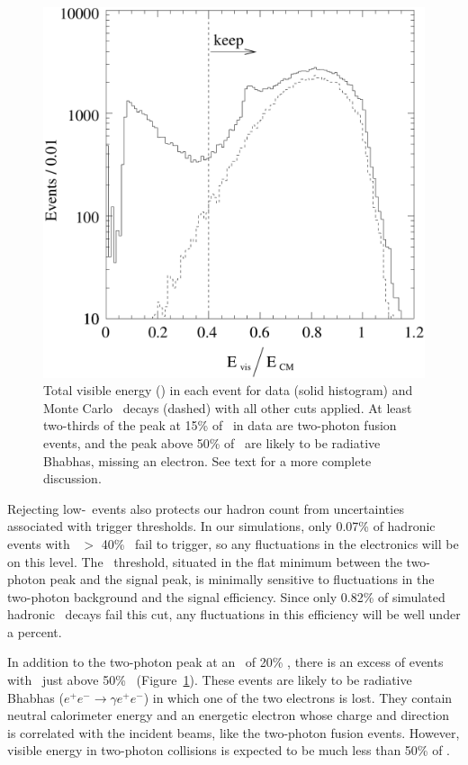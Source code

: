 \documentclass{cornell}
\begin{document}
\begin{figure}[p]
  \begin{center}
    \includegraphics[width=\linewidth]{plots/visen}
  \end{center}
  \caption[Visible energy distribution]{\label{visen} Total visible energy (\visen) in each event
  for data (solid histogram) and Monte Carlo \ups\ decays (dashed)
  with all other cuts applied.  At least two-thirds of the peak at
  15\% of \ecm\ in data are two-photon fusion events, and the peak
  above 50\% of \ecm\ are likely to be radiative Bhabhas, missing an
  electron.  See text for a more complete discussion.}
\end{figure}

Rejecting low-\visen\ events also protects our hadron count from
uncertainties associated with trigger thresholds.  In our simulations,
only 0.07\% of hadronic events with \visen\ $>$ 40\% \ecm\ fail to
trigger, so any fluctuations in the electronics will be on this level.
The \visen\ threshold, situated in the flat minimum between the
two-photon peak and the signal peak, is minimally sensitive to
fluctuations in the two-photon background and the signal efficiency.
Since only 0.82\% of simulated hadronic \ups\ decays fail this cut,
any fluctuations in this efficiency will be well under a percent.

In addition to the two-photon peak at an \visen\ of 20\% \ecm, there
is an excess of events with \visen\ just above 50\% \ecm\
(Figure~\ref{visen}).  These events are likely to be radiative Bhabhas
($e^+e^- \to \gamma e^+e^-$) in which one of the two electrons is
lost.  They contain neutral calorimeter energy and an energetic
electron whose charge and direction is correlated with the incident
beams, like the two-photon fusion events.  However, visible energy in
two-photon collisions is expected to be much less than 50\% of \ecm.
\end{document}
